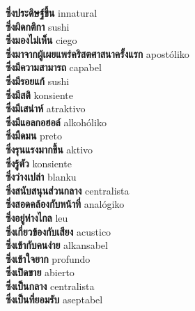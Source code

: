 \textbf{ ซึ่งประดิษฐ์ขึ้น  } innatural \\
\textbf{ ซึ่งผิดกติกา  } sushi \\
\textbf{ ซึ่งมองไม่เห็น  } ciego \\
\textbf{ ซึ่งมาจากผู้เผยแพร่คริสตศาสนาครั้งแรก  } apostóliko \\
\textbf{ ซึ่งมีความสามารถ  } capabel \\
\textbf{ ซึ่งมีรอยแก้  } sushi \\
\textbf{ ซึ่งมีสติ  } konsiente \\
\textbf{ ซึ่งมีเสน่าห์  } atraktivo \\
\textbf{ ซึ่งมีแอลกอฮอล์  } alkohóliko \\
\textbf{ ซึ่งมืดมน  } preto \\
\textbf{ ซึ่งรุนแรงมากขึ้น  } aktivo \\
\textbf{ ซึ่งรู้ตัว  } konsiente \\
\textbf{ ซึ่งว่างเปล่า  } blanku \\
\textbf{ ซึ่งสนับสนุนส่วนกลาง  } centralista \\
\textbf{ ซึ่งสอดคล้องกับหน้าที่  } analógiko \\
\textbf{ ซึ่งอยู่ห่างไกล  } leu \\
\textbf{ ซึ่งเกี่ยวข้องกับเสียง  } acustico \\
\textbf{ ซึ่งเข้ากับคนง่าย  } alkansabel \\
\textbf{ ซึ่งเข้าใจยาก  } profundo \\
\textbf{ ซึ่งเปิดขาย  } abierto \\
\textbf{ ซึ่งเป็นกลาง  } centralista \\
\textbf{ ซึ่งเป็นที่ยอมรับ  } aseptabel \\

